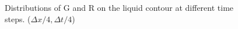 \documentclass[a4paper,12pt]{article}
\begin{document}
\begin{figure}[!ht]
     \hfill
     \caption{Distributions of G and R on the liquid contour at different time steps. ($\Delta x/4, \Delta t/4$)}
     \label{fig:Ech}
   \end{figure}
\end{document}
